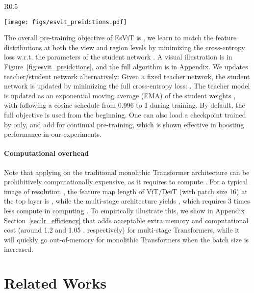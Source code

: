 \documentclass{article} \usepackage{iclr2022_conference,times}
\newcommand{\shortname}{EsViT}
\begin{document}
\begin{wrapfigure}{R}{0.5\textwidth}
\vspace{-5mm}
\begin{minipage}{0.5\textwidth}
\scriptsize
\centering
\hspace{-3mm}
\texttt{[image: figs/esvit\_preidctions.pdf]}
\vspace{-1mm}
\caption{Pre-training objectives, including view-level  (left) and region-level (right) prediction.} 
\label{fig:esvit_preidctions}
\vspace{-3mm}
\end{minipage}
\end{wrapfigure}
The overall pre-training objective of \shortname{} is , we learn to match the feature distributions at both the view and region levels by minimizing the cross-entropy loss w.r.t. the parameters of the student network . A visual illustration is in Figure~\ref{fig:esvit_preidctions}, and the full algorithm is in Appendix. 
We updates teacher/student network alternatively:
 Given a fixed teacher network, the student network is updated by minimizing the full cross-entropy loss:
.
 The teacher model is updated as an exponential moving average (EMA) of the student weights
, with   following a cosine schedule
from 0.996 to 1 during training.
By default, the full objective  is used from the beginning. One can also load a checkpoint trained by  only, and add  for continual pre-training, which is shown effective in boosting performance in our experiments.

\paragraph{Computational overhead}
Note that applying  on the traditional monolithic Transformer architecture can be prohibitively computationally expensive, as it requires  to compute . For a typical image of resolution , the feature map length  of ViT/DeiT (with patch size 16) at the top layer is , while the multi-stage architecture yields , which requires 3 times less compute in computing . To empirically illustrate this, we show in Appendix Section~\ref{sec:lr_efficiency} that  adds acceptable extra memory and computational cost (around 1.2 and 1.05 , respectively) for multi-stage Transformers, while it will quickly go out-of-memory for monolithic Transformers when the batch size is increased.


\vspace{-3mm}
\section{Related Works}
\vspace{-3mm}
\end{document}
